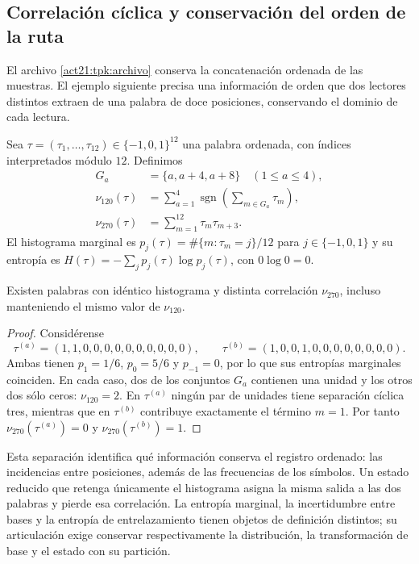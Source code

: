 \subsection{Correlación cíclica y conservación del orden de la ruta}
\label{sec:rec27-memoria}

El archivo \eqref{act21:tpk:archivo} conserva la concatenación
ordenada de las muestras. El ejemplo siguiente precisa una información
de orden que dos lectores distintos extraen de una palabra de doce
posiciones, conservando el dominio de cada lectura.

Sea $\tau=(\tau_1,\ldots,\tau_{12})\in\{-1,0,1\}^{12}$ una palabra
ordenada, con índices interpretados módulo $12$. Definimos
\[
\begin{aligned}
 G_a&=\{a,a+4,a+8\}\quad(1\leq a\leq4),\\
 \nu_{120}(\tau)&=\sum_{a=1}^4\operatorname{sgn}
 \left(\sum_{m\in G_a}\tau_m\right),\\
 \nu_{270}(\tau)&=\sum_{m=1}^{12}\tau_m\tau_{m+3}.
\end{aligned}
\]
El histograma marginal es $p_j(\tau)=\#\{m:\tau_m=j\}/12$ para
$j\in\{-1,0,1\}$ y su entropía es
$H(\tau)=-\sum_j p_j(\tau)\log p_j(\tau)$, con $0\log0=0$.

\begin{proposition}
Existen palabras con idéntico histograma y distinta correlación
$\nu_{270}$, incluso manteniendo el mismo valor de $\nu_{120}$.
\end{proposition}
\begin{proof}
Considérense
\[
 \tau^{(a)}=(1,1,0,0,0,0,0,0,0,0,0,0),\qquad
 \tau^{(b)}=(1,0,0,1,0,0,0,0,0,0,0,0).
\]
Ambas tienen $p_1=1/6$, $p_0=5/6$ y $p_{-1}=0$, por lo que sus
entropías marginales coinciden. En cada caso, dos de los conjuntos $G_a$
contienen una unidad y los otros dos sólo ceros: $\nu_{120}=2$.
En $\tau^{(a)}$ ningún par de unidades tiene separación cíclica tres,
mientras que en $\tau^{(b)}$ contribuye exactamente el término $m=1$.
Por tanto $\nu_{270}(\tau^{(a)})=0$ y $\nu_{270}(\tau^{(b)})=1$.
\end{proof}

Esta separación identifica qué información conserva el registro ordenado:
las incidencias entre posiciones, además de las frecuencias de los símbolos.
Un estado reducido que retenga únicamente el histograma asigna la misma
salida a las dos palabras y pierde esa correlación. La entropía marginal,
la incertidumbre entre bases y la entropía de entrelazamiento tienen objetos
de definición distintos; su articulación exige conservar respectivamente
la distribución, la transformación de base y el estado con su partición.
